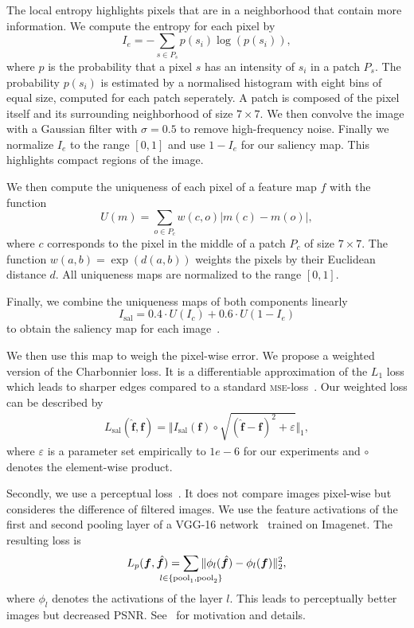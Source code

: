 \documentclass{scrartcl}
\newcommand{\img}{\bm{f}} %
\begin{document}
The local entropy highlights pixels that are in a neighborhood that contain more information.
We compute the entropy for each pixel by
\begin{equation}
  \label{eq:entr}
  I_e = - \sum_{s \in P_s} p(s_i) \log(p(s_i)),
\end{equation}
where \(p\) is the probability that a pixel \(s\) has an intensity of \(s_i\) in a patch \(P_s\).
The probability $p(s_i)$ is estimated by a normalised histogram with eight bins of equal size, computed for each patch seperately.
A patch is composed of the pixel itself and its surrounding neighborhood of size \(7 \times 7\).
We then convolve the image with a Gaussian filter with \(\sigma = 0.5\) to remove high-frequency noise.
Finally we normalize $I_e$ to the range \([0, 1]\) and use $1 - I_e$ for our saliency map.
This highlights compact regions of the image.

We then compute the uniqueness of each pixel of a feature map \(f\) with the function
\begin{equation}
  \label{eq:uniq}
  U(m) = \sum_{o \in P_c} w(c, o) \vert m(c) - m(o) \vert,
\end{equation}
where \(c\) corresponds to the pixel in the middle of a patch \(P_c\) of size \(7 \times 7\).
The function \(w(a,b) = \exp(d(a, b))\) weights the pixels by their Euclidean distance \(d\).
All uniqueness maps are normalized to the range \([0,1]\).

Finally, we combine the uniqueness maps of both components linearly
\begin{equation}
  \label{eq:saliency}
  I_{\text{sal}} = 0.4 \cdot U(I_c) + 0.6 \cdot U(1 - I_e)
\end{equation}
to obtain the saliency map for each image~\cite{SaliencyGAN}.

We then use this map to weigh the pixel-wise error.
We propose a weighted version of the Charbonnier loss.
It is a differentiable approximation of the $L_1$ loss which leads to sharper edges compared to a standard \textsc{mse}-loss~\cite{LapSRN}.
Our weighted loss can be described by
\begin{align}
\label{eq:charbonnier}
  L_{\text{sal}}( \hat{\bm{\img}}, \bm{\img}) = \Vert I_{\text{sal}}(\img) \circ \sqrt{ (\hat{\img} - \img)^2 + \varepsilon} \Vert_1,
\end{align}
where $\varepsilon$ is a parameter set empirically to $1e-6$ for our experiments and \(\circ\) denotes the element-wise product.

Secondly, we use a perceptual loss~\cite{PerceptualLoss}.
It does not compare images pixel-wise but consideres the difference of filtered images.
We use the feature activations of the first and second pooling layer of a VGG-16 network~\cite{Vgg} trained on Imagenet.
The resulting loss is
\begin{equation}
  \label{eq:perceptual-loss}
  L_p(\img, \hat{\img}) = \sum_{\mathclap{l \in \{ \text{pool}_1, \text{pool}_2 \}}} \Vert \phi_l( \hat{\img} ) - \phi_l (\img) \Vert_2^2,
\end{equation}
where \(\phi_l\) denotes the activations of the layer \(l\).
This leads to perceptually better images but decreased PSNR.
See~\cite{PerceptualLoss} for motivation and details.
\end{document}
